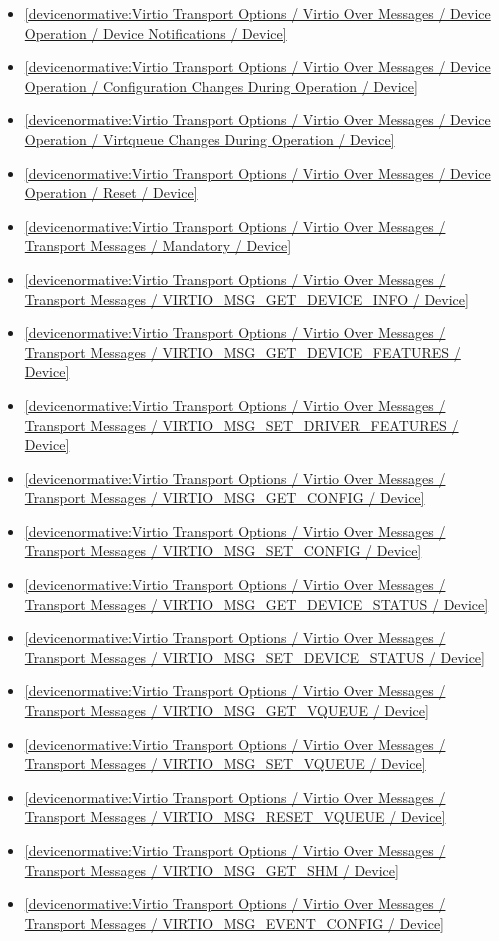 \begin{itemize}
\item \ref{devicenormative:Virtio Transport Options / Virtio Over Messages / Device Operation / Device Notifications / Device}
\item \ref{devicenormative:Virtio Transport Options / Virtio Over Messages / Device Operation / Configuration Changes During Operation / Device}
\item \ref{devicenormative:Virtio Transport Options / Virtio Over Messages / Device Operation / Virtqueue Changes During Operation / Device}
\item \ref{devicenormative:Virtio Transport Options / Virtio Over Messages / Device Operation / Reset / Device}
\item \ref{devicenormative:Virtio Transport Options / Virtio Over Messages / Transport Messages / Mandatory / Device}
\item \ref{devicenormative:Virtio Transport Options / Virtio Over Messages / Transport Messages / VIRTIO_MSG_GET_DEVICE_INFO / Device}
\item \ref{devicenormative:Virtio Transport Options / Virtio Over Messages / Transport Messages / VIRTIO_MSG_GET_DEVICE_FEATURES / Device}
\item \ref{devicenormative:Virtio Transport Options / Virtio Over Messages / Transport Messages / VIRTIO_MSG_SET_DRIVER_FEATURES / Device}
\item \ref{devicenormative:Virtio Transport Options / Virtio Over Messages / Transport Messages / VIRTIO_MSG_GET_CONFIG / Device}
\item \ref{devicenormative:Virtio Transport Options / Virtio Over Messages / Transport Messages / VIRTIO_MSG_SET_CONFIG / Device}
\item \ref{devicenormative:Virtio Transport Options / Virtio Over Messages / Transport Messages / VIRTIO_MSG_GET_DEVICE_STATUS / Device}
\item \ref{devicenormative:Virtio Transport Options / Virtio Over Messages / Transport Messages / VIRTIO_MSG_SET_DEVICE_STATUS / Device}
\item \ref{devicenormative:Virtio Transport Options / Virtio Over Messages / Transport Messages / VIRTIO_MSG_GET_VQUEUE / Device}
\item \ref{devicenormative:Virtio Transport Options / Virtio Over Messages / Transport Messages / VIRTIO_MSG_SET_VQUEUE / Device}
\item \ref{devicenormative:Virtio Transport Options / Virtio Over Messages / Transport Messages / VIRTIO_MSG_RESET_VQUEUE / Device}
\item \ref{devicenormative:Virtio Transport Options / Virtio Over Messages / Transport Messages / VIRTIO_MSG_GET_SHM / Device}
\item \ref{devicenormative:Virtio Transport Options / Virtio Over Messages / Transport Messages / VIRTIO_MSG_EVENT_CONFIG / Device}
\end{itemize}

